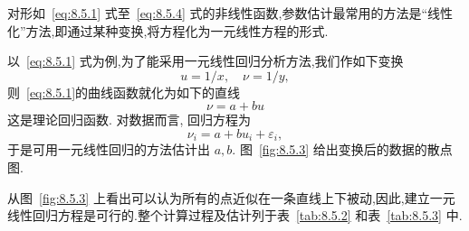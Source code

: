对形如~\eqref{eq:8.5.1} 式至~\eqref{eq:8.5.4} 式的非线性函数,参数估计最常用的方法是“线性化”方法,即通过某种变换,将方程化为一元线性方程的形式.

以~\eqref{eq:8.5.1} 式为例,为了能采用一元线性回归分析方法,我们作如下变换
\begin{equation*}
  u =1/x, \quad \nu =1/y,
\end{equation*}
则~\eqref{eq:8.5.1}的曲线函数就化为如下的直线
\begin{equation*}
  \nu = a + bu
\end{equation*}
这是理论回归函数. 对数据而言, 回归方程为
\begin{equation*}
\nu_i=a+b u_i+\varepsilon_i,
\end{equation*}
于是可用一元线性回归的方法估计出 $a,b$. 图~\ref{fig:8.5.3} 给出变换后的数据的散点图.

从图~\ref{fig:8.5.3} 上看出可以认为所有的点近似在一条直线上下被动,因此,建立一元线性回归方程是可行的.整个计算过程及估计列于表~\ref{tab:8.5.2} 和表~\ref{tab:8.5.3} 中.

